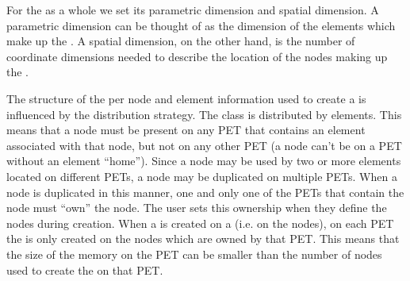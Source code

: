 \documentclass[letterpaper,10pt,english]{sphinxmanual}
\begin{document}
For the {\hyperref[\detokenize{mesh:ESMF.api.mesh.Mesh}]{}} as a whole we set its parametric dimension and spatial dimension.
A {\hyperref[\detokenize{mesh:ESMF.api.mesh.Mesh}]{}} parametric dimension can be thought of as the dimension of the elements
which make up the {\hyperref[\detokenize{mesh:ESMF.api.mesh.Mesh}]{}}. A {\hyperref[\detokenize{mesh:ESMF.api.mesh.Mesh}]{}} spatial dimension, on the other hand, is the
number of coordinate dimensions needed to describe the location of the nodes
making up the {\hyperref[\detokenize{mesh:ESMF.api.mesh.Mesh}]{}}.

The structure of the per node and element information used to create a {\hyperref[\detokenize{mesh:ESMF.api.mesh.Mesh}]{}} is
influenced by the {\hyperref[\detokenize{mesh:ESMF.api.mesh.Mesh}]{}} distribution strategy. The {\hyperref[\detokenize{mesh:ESMF.api.mesh.Mesh}]{}} class is distributed by
elements. This means that a node must be present on any PET that contains
an element associated with that node, but not on any other PET (a node
can’t be on a PET without an element “home”). Since a node may be used by
two or more elements located on different PETs, a node may be duplicated
on multiple PETs. When a node is duplicated in this manner, one and only
one of the PETs that contain the node must “own” the node. The user sets
this ownership when they define the nodes during {\hyperref[\detokenize{mesh:ESMF.api.mesh.Mesh}]{}}
creation. When a {\hyperref[\detokenize{field:ESMF.api.field.Field}]{}} is created on a
{\hyperref[\detokenize{mesh:ESMF.api.mesh.Mesh}]{}} (i.e. on the {\hyperref[\detokenize{mesh:ESMF.api.mesh.Mesh}]{}} nodes),
on each PET the {\hyperref[\detokenize{field:ESMF.api.field.Field}]{}} is only
created on the nodes which are owned by that PET. This means that the size
of the {\hyperref[\detokenize{field:ESMF.api.field.Field}]{}} memory on the PET can be smaller than the
number of nodes used to create the {\hyperref[\detokenize{mesh:ESMF.api.mesh.Mesh}]{}} on that PET.
\end{document}
